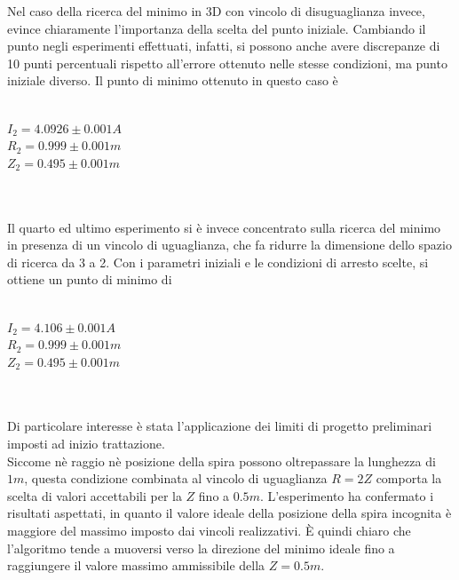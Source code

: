 \documentclass[a4paper, 11pt]{article}
\begin{document}
Nel caso della ricerca del minimo in 3D con vincolo di disuguaglianza invece,
evince chiaramente l'importanza della scelta del punto iniziale. Cambiando il
punto negli esperimenti effettuati, infatti, si possono anche avere discrepanze
di 10 punti percentuali rispetto all'errore ottenuto nelle stesse condizioni, ma
punto iniziale diverso. Il punto di minimo ottenuto in questo caso è \\ \\
\centerline{ $I_{2} = 4.0926 \pm 0.001 A$ \\ $R_{2} = 0.999 \pm 0.001m$ \\ $Z_{2}
= 0.495 \pm 0.001m$} \\ \\
Il quarto ed ultimo esperimento si è invece concentrato sulla ricerca del minimo
in presenza di un vincolo di uguaglianza, che fa ridurre la dimensione dello
spazio di ricerca da 3 a 2. Con i parametri iniziali e le condizioni di arresto
scelte, si ottiene un punto di minimo di \\ \\
\centerline{ $I_{2} = 4.106 \pm 0.001 A$ \\ $R_{2} = 0.999 \pm 0.001m$ \\ $Z_{2}
= 0.495 \pm 0.001m$} \\ \\
Di particolare interesse è stata l'applicazione dei limiti di progetto
preliminari imposti ad inizio trattazione. \\ 
Siccome nè raggio nè posizione della spira possono oltrepassare la lunghezza di
$1m$, questa condizione combinata al vincolo di uguaglianza $R = 2Z$ comporta la
scelta di valori accettabili per la $Z$ fino a $0.5m$. L'esperimento ha
confermato i risultati aspettati, in quanto il valore ideale della posizione
della spira incognita è maggiore del massimo imposto dai vincoli realizzativi. È
quindi chiaro che l'algoritmo tende a muoversi verso la direzione del minimo
ideale fino a raggiungere il valore massimo ammissibile della $Z = 0.5m$.
\end{document}
